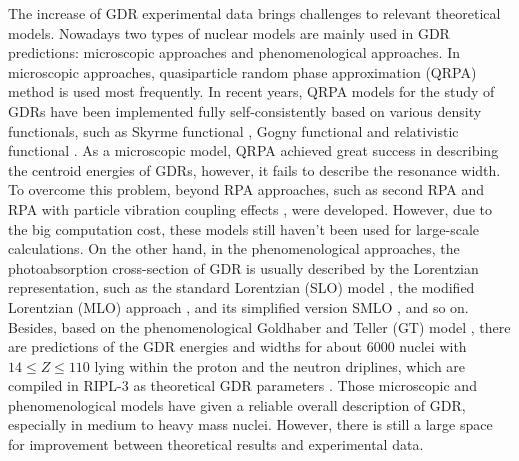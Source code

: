 \documentclass[twocolumn,showpacs,superscriptaddress,amsmath,amssymb,prc,preprintnumbers]{revtex4-1}
\begin{document}
The increase of GDR experimental data brings challenges to relevant theoretical models.
Nowadays two types of nuclear models are mainly used in GDR predictions: microscopic approaches and phenomenological approaches.
In microscopic approaches, quasiparticle random phase approximation (QRPA) method is used most frequently.
In recent years, QRPA models for the study of GDRs  have been implemented fully self-consistently based on various density functionals, such as Skyrme functional \cite{Goriely2002,Goriely2004}, Gogny functional \cite{Peru200744,Goriely2018,Martini2011} and relativistic functional \cite{Paar2003,Paar2007}. As a microscopic model, QRPA achieved great success in describing the centroid energies of GDRs, however, it fails to describe the resonance width. To overcome this problem, beyond RPA approaches, such as second RPA \cite{Gambacurta2010,Grasso2020} and RPA with particle vibration coupling effects \cite{Litvinova2007,Egorova2016,Roca-Maza2017}, were developed. However, due to the big computation cost, these models still haven't been used for large-scale calculations.
On the other hand, in the phenomenological approaches, the photoabsorption cross-section of GDR is usually described by the Lorentzian representation, such as the standard Lorentzian (SLO) model \cite{DMBrink195501, Axel1962}, the modified Lorentzian (MLO) approach \cite{Plujko2002123}, and its simplified version SMLO \cite{Plujko20071720}, and so on.
Besides, based on the phenomenological Goldhaber and Teller (GT) model \cite{Goldhaber1948,Goriely199810}, there are predictions of the GDR energies and widths for about 6000 nuclei with $14\leq Z \leq110$ lying within the proton and the neutron driplines, which are compiled in RIPL-3 as theoretical GDR parameters \cite{Capote2009,RIPL3}.
Those microscopic and phenomenological models have given a reliable overall description of GDR, especially in medium to heavy mass nuclei.
However, there is still a large space for improvement between theoretical results and  experimental data.
\end{document}
